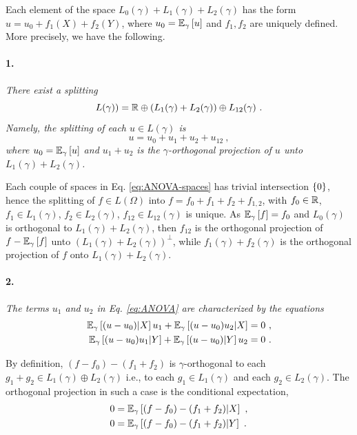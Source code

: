 \documentclass[runningheads]{llncs}
\begin{document}
Each element of the space $L_0(\gamma) + L_1(\gamma) + L_2(\gamma)$
has the form $u = u_0 + f_1(X) + f_2(Y)$, where
$u_0 = {\operatorname{\mathbb E}}_{\gamma}\left[u\right]$ and $f_1,f_2$ are uniquely defined. More
precisely, we have the following.

\paragraph{1.} \textit{There exist a splitting
%
\begin{equation*}
%
  L(\gamma)) = \reals \oplus \left(L_1(\gamma) + L_2(\gamma)\right) \oplus L_{12}(\gamma) \ . 
\end{equation*}
%
Namely, the splitting of each $u \in L(\gamma)$ is
%
\begin{equation}
 \label{eq:ANOVA}
 u = u_0 + u_1 + u_2 + u_{12} \ ,
\end{equation}
%
where $u_0={\operatorname{\mathbb E}}_{\gamma}\left[u\right]$ and $u_1+u_2$ is the
$\gamma$-orthogonal projection of $u$ unto
$L_1(\gamma) + L_2(\gamma)$.}

Each couple of spaces in Eq. \eqref{eq:ANOVA-spaces} has trivial intersection $\left\{ 0 \right\}$, hence the splitting of $f \in L(\Omega)$ into $f = f_0 + f_1 + f_2 + f_{1,2}$, with $f_0 \in \mathbb R$, $f_1 \in L_1(\gamma)$, $f_2 \in L_2(\gamma)$, $f_{12} \in L_{12}(\gamma)$ is unique. As ${\operatorname{\mathbb E}}_{\gamma}\left[f\right] = f_0$ and $L_0(\gamma)$ is orthogonal to $L_1(\gamma)+L_2(\gamma)$, then $f_{12}$ is the orthogonal projection of $f - {\operatorname{\mathbb E}}_{\gamma}\left[f\right]$ unto $(L_1(\gamma)+L_2(\gamma))^\perp$, while $f_1(\gamma)+f_2(\gamma)$ is the orthogonal projection of $f$ onto $L_1(\gamma)+L_2(\gamma)$.

\paragraph{2.}\textit{The terms $u_1$ and $u_2$ in Eq. \eqref{eq:ANOVA} are characterized by the equations
%
\begin{equation}
\label{eq:projetion}
  \begin{aligned}
    \condexpectat \gamma {(u - u_0)} X u_1 + \condexpectat \gamma {(u-u_0)u_2} X &= 0 \ , \\
    \condexpectat \gamma {(u - u_0)u_1} Y + \condexpectat \gamma {(u-u_0)} Y u_2 &= 0 \ .
  \end{aligned}
%
\end{equation}}

By definition, $(f - f_0) - (f_1 + f_2)$ is $\gamma$-orthogonal to each $g_1+g_2 \in L_1(\gamma)\oplus L_2(\gamma)$ i.e., to each $g_1 \in L_1(\gamma)$ and each $g_2 \in L_2(\gamma)$. The orthogonal projection in such a case is the conditional expectation,
%
  \begin{align*}
    0 &= {\operatorname{\mathbb E}}_{\gamma}\left[(f-f_0) - (f_1+f_2) \middle| X\right]  \ , \\
   0 &= {\operatorname{\mathbb E}}_{\gamma}\left[(f-f_0) - (f_1+f_2) \middle| Y\right] \ .
  \end{align*}
\end{document}
